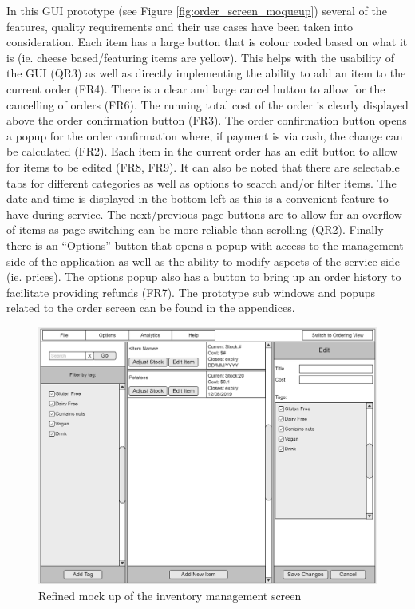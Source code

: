 In this GUI prototype (see Figure \ref{fig:order_screen_moqueup}) several of the features, quality requirements and their use cases have been taken into consideration. Each item has a large button that is colour coded based on what it is (ie. cheese based/featuring items are yellow). This helps with the usability of the GUI (QR3) as well as directly implementing the ability to add an item to the current order (FR4). There is a clear and large cancel button to allow for the cancelling of orders (FR6). The running total cost of the order is clearly displayed above the order confirmation button (FR3). The order confirmation button opens a popup for the order confirmation where, if payment is via cash, the change can be calculated (FR2). Each item in the current order has an edit button to allow for items to be edited (FR8, FR9). It can also be noted that there are selectable tabs for different categories as well as options to search and/or filter items. The date and time is displayed in the bottom left as this is a convenient feature to have during service. The next/previous page buttons are to allow for an overflow of items as page switching can be more reliable than scrolling (QR2). Finally there is an “Options” button that opens a popup with access to the management side of the application as well as the ability to modify aspects of the service side (ie. prices). The options popup also has a button to bring up an order history to facilitate providing refunds (FR7).
The prototype sub windows and popups related to the order screen can be found in the appendices.

\begin{figure}[ht]
	\centering
	\includegraphics[width=150mm]{images/GUI_prototypes/Inventory_screen.png}
	\caption{Refined mock up of the inventory management screen}
	\label{fig:management_screen_moqueup}
\end{figure}

